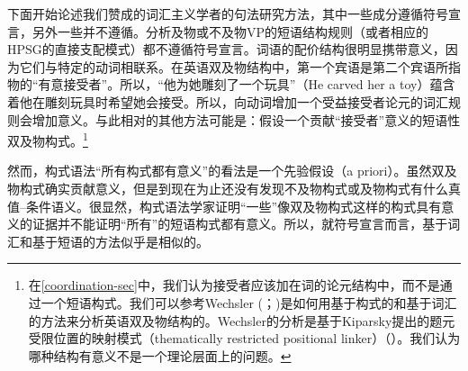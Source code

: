     下面开始论述我们赞成的词汇主义学者的句法研究方法，其中一些成分遵循符号宣言，另外一些并不遵循。分析及物或不及物VP的短语结构规则（或者相应的HPSG的直接支配模式）都不遵循符号宣言。词语的配价结构很明显携带意义，因为它们与特定的动词相联系。在英语双及物结构中，第一个宾语是第二个宾语所指物的“有意接受者”。所以，“他为她雕刻了一个玩具”（He carved her a toy）蕴含着他在雕刻玩具时希望她会接受。所以，向动词增加一个受益接受者论元的词汇规则会增加意义。与此相对的其他方法可能是：假设一个贡献“接受者”意义的短语性双及物构式。\footnote{%
在\ref{coordination-sec}中，我们认为接受者应该加在词的论元结构中，而不是通过一个短语构式。我们可以参考Wechsler (\citeyear[--113]{Wechsler91a-u}；\citeyear[--89]{Wechsler95a-u})是如何用基于构式的和基于词汇的方法来分析英语双及物结构的。Wechsler的分析是基于Kiparsky提出的题元受限位置的映射模式（thematically restricted positional linker）（\citeyear{Kiparsky87a-u, Kiparsky88a-u}）。我们认为哪种结构有意义不是一个理论层面上的问题。
}

然而，构式语法“所有构式都有意义”的看法是一个先验假设（a priori）。虽然双及物构式确实贡献意义，但是到现在为止还没有发现不及物构式或及物构式有什么真值--条件语义。很显然，构式语法学家证明“一些”像双及物构式这样的构式具有意义的证据并不能证明“所有”的短语构式都有意义。所以，就符号宣言而言，基于词汇和基于短语的方法似乎是相似的。

